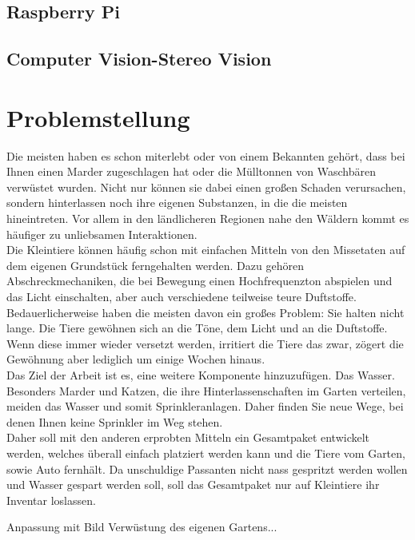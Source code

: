 \subsection{Raspberry Pi}

\subsection{Computer Vision-Stereo Vision}

\section{Problemstellung}

Die meisten haben es schon miterlebt oder von einem Bekannten gehört,
dass bei Ihnen einen Marder zugeschlagen hat oder die Mülltonnen von
Waschbären verwüstet wurden. Nicht nur können sie dabei einen großen
Schaden verursachen, sondern hinterlassen noch ihre eigenen Substanzen,
in die die meisten hineintreten. Vor allem in den ländlicheren Regionen
nahe den Wäldern kommt es häufiger zu unliebsamen Interaktionen.
\\
Die Kleintiere können häufig schon mit einfachen Mitteln von den Missetaten
auf dem eigenen Grundstück ferngehalten werden. Dazu gehören Abschreckmechaniken,
die bei Bewegung einen Hochfrequenzton abspielen und das Licht einschalten,
aber auch verschiedene teilweise teure Duftstoffe. Bedauerlicherweise haben
die meisten davon ein großes Problem: Sie halten nicht lange. Die Tiere gewöhnen
sich an die Töne, dem Licht und an die Duftstoffe. Wenn diese immer wieder
versetzt werden, irritiert die Tiere das zwar, zögert die Gewöhnung aber
lediglich um einige Wochen hinaus.
\\
Das Ziel der Arbeit ist es, eine weitere Komponente hinzuzufügen. Das Wasser.
Besonders Marder und Katzen, die ihre Hinterlassenschaften im Garten verteilen,
meiden das Wasser und somit Sprinkleranlagen. Daher finden Sie neue Wege, bei
denen Ihnen keine Sprinkler im Weg stehen.
\\
Daher soll mit den anderen erprobten Mitteln ein Gesamtpaket entwickelt werden,
welches überall einfach platziert werden kann und die Tiere vom Garten, sowie Auto
fernhält. Da unschuldige Passanten nicht nass gespritzt werden wollen und Wasser
gespart werden soll, soll das Gesamtpaket nur auf Kleintiere ihr Inventar loslassen.

Anpassung mit Bild Verwüstung des eigenen Gartens...